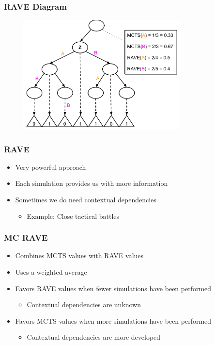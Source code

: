 \documentclass{beamer}
\begin{document}
\begin{frame}[fragile]
\frametitle{RAVE Diagram}
\begin{figure}[h]
	\includegraphics[width=8.5cm]{Diagrams/Rave/RAVEDiagram.pdf}
	\centering
\end{figure}
\end{frame}

\begin{frame}
\frametitle{RAVE}
\begin{itemize}
	\item Very powerful approach
	\item Each simulation provides us with more information
	\item Sometimes we do need contextual dependencies
	\begin{itemize}
		\item Example: Close tactical battles
	\end{itemize}
\end{itemize}
\end{frame}

\begin{frame}
\frametitle{MC RAVE}
\begin{itemize}
	\item Combines MCTS values with RAVE values
	\item Uses a weighted average
	\item Favors RAVE values when fewer simulations have been performed
	\begin{itemize}
		\item Contextual dependencies are unknown
	\end{itemize}
	\item Favors MCTS values when more simulations have been performed
	\begin{itemize}
		\item Contextual dependencies are more developed
	\end{itemize}
\end{itemize}
\end{frame}
\end{document}

